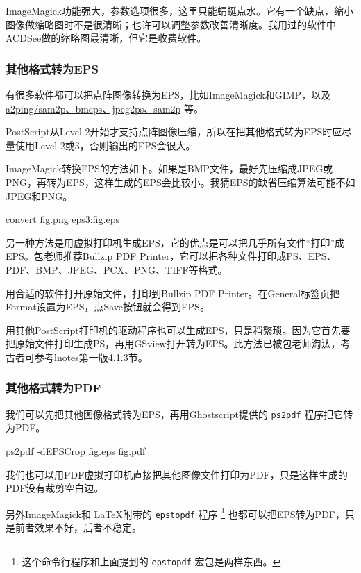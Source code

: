 ImageMagick功能强大，参数选项很多，这里只能蜻蜓点水。它有一个缺点，缩小图像做缩略图时不是很清晰；也许可以调整参数改善清晰度。我用过的软件中ACDSee做的缩略图最清晰，但它是收费软件。

\subsubsection{其他格式转为EPS}

有很多软件都可以把点阵图像转换为EPS，比如ImageMagick和GIMP，以及 \href{http://www.tex.ac.uk/cgi-bin/texfaq2html?label=dvipsgraphics}{a2ping/sam2p、bmeps、jpeg2ps、sam2p} 等。

PostScript从Level 2开始才支持点阵图像压缩，所以在把其他格式转为EPS时应尽量使用Level 2或3，否则输出的EPS会很大。

ImageMagick转换EPS的方法如下。如果是BMP文件，最好先压缩成JPEG或PNG，再转为EPS，这样生成的EPS会比较小。我猜EPS的缺省压缩算法可能不如JPEG和PNG。

\begin{Code}
convert fig.png eps3:fig.eps
\end{Code}

另一种方法是用虚拟打印机生成EPS，它的优点是可以把几乎所有文件“打印”成EPS。包老师推荐Bullzip PDF Printer，它可以把各种文件打印成PS、EPS、PDF、BMP、JPEG、PCX、PNG、TIFF等格式。

用合适的软件打开原始文件，打印到Bullzip PDF Printer。在General标签页把Format设置为EPS，点Save按钮就会得到EPS。

用其他PostScript打印机的驱动程序也可以生成EPS，只是稍繁琐。因为它首先要把原始文件打印生成PS，再用GSview打开转为EPS。此方法已被包老师淘汰，考古者可参考lnotes第一版\citep{Huang_2008}4.1.3节。

\subsubsection{其他格式转为PDF}

我们可以先把其他图像格式转为EPS，再用Ghostscript提供的 \texttt{ps2pdf} 程序把它转为PDF。

\begin{Code}
ps2pdf -dEPSCrop fig.eps fig.pdf
\end{Code}

我们也可以用PDF虚拟打印机直接把其他图像文件打印为PDF，只是这样生成的PDF没有裁剪空白边。

另外ImageMagick和 \LaTeX 附带的 \texttt{epstopdf} 程序 \footnote{这个命令行程序和上面提到的 \texttt{epstopdf} 宏包是两样东西。} 也都可以把EPS转为PDF，只是前者效果不好，后者不稳定。


